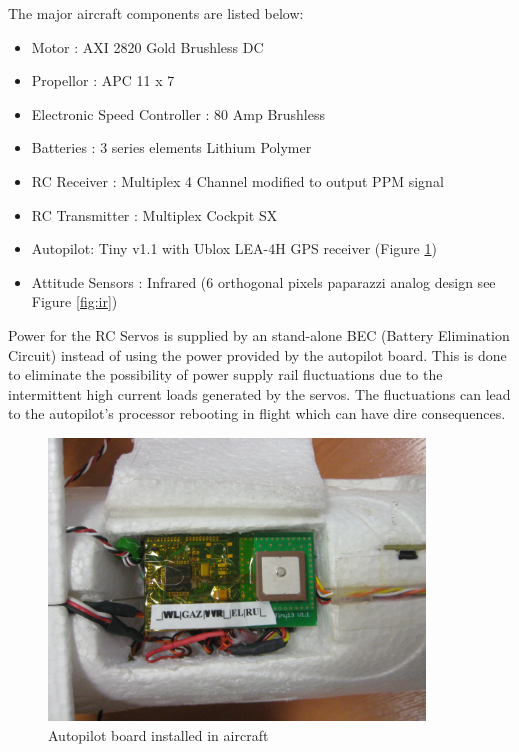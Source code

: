\documentclass[a4paper,11pt]{report}
\begin{document}
The major aircraft components are listed below:

\begin{itemize}
 \item Motor : AXI 2820 Gold Brushless DC
 \item Propellor : APC 11 x 7 
 \item Electronic Speed Controller : 80 Amp Brushless
 \item Batteries : 3 series elements Lithium Polymer
 \item RC Receiver : Multiplex 4 Channel modified to output PPM signal
 \item RC Transmitter : Multiplex Cockpit SX
 \item Autopilot: Tiny v1.1 with Ublox LEA-4H GPS receiver (Figure \ref{fig:tiny})
 \item Attitude Sensors : Infrared (6 orthogonal pixels paparazzi analog design see Figure \ref{fig:ir})
\end{itemize}

Power for the RC Servos is supplied by an stand-alone BEC (Battery Elimination Circuit) instead of using the power provided by the autopilot board. This is done to eliminate the possibility of power supply rail fluctuations due to the intermittent high current loads generated by the servos. The fluctuations can lead to the autopilot's processor rebooting in flight which can have dire consequences.

\begin{figure}[ht]
 \centering
 \includegraphics[width=10cm]{tiny_inside.png}
 \caption{Autopilot board installed in aircraft}
 \label{fig:tiny}
\end{figure}
\end{document}
